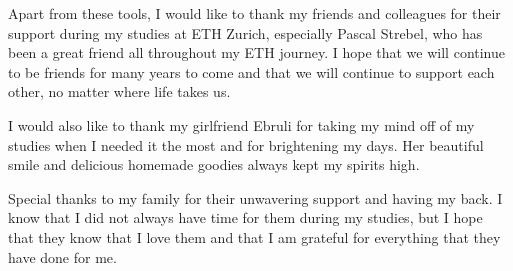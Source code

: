 Apart from these tools, I would like to thank my friends and colleagues for their support during my studies at ETH Zurich,
especially Pascal Strebel, who has been a great friend all throughout my ETH journey.
I hope that we will continue to be friends for many years to come and that we will continue to support each other, no matter where life takes us.

I would also like to thank my girlfriend Ebruli for taking my mind off of my studies when I needed it the most and
for brightening my days. 
Her beautiful smile and delicious homemade goodies always kept my spirits high.

Special thanks to my family for their unwavering support and having my back.
I know that I did not always have time for them during my studies, 
but I hope that they know that I love them and that I am grateful for everything that they have done for me.

